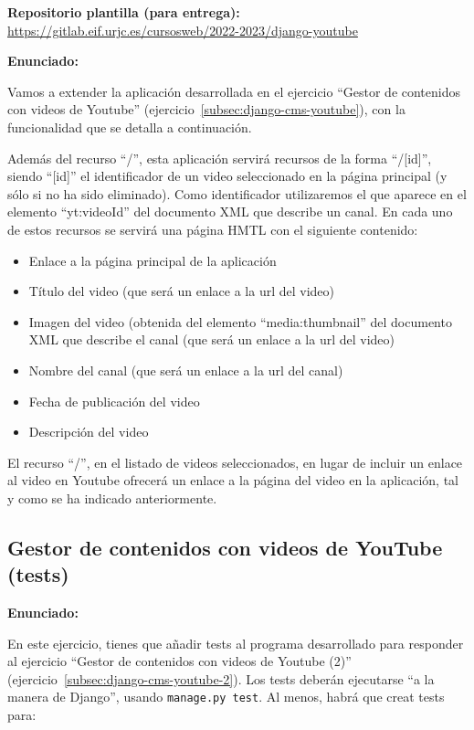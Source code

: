 \textbf{Repositorio plantilla (para entrega):} \\
\url{https://gitlab.eif.urjc.es/cursosweb/2022-2023/django-youtube}

\textbf{Enunciado:}

Vamos a extender la aplicación desarrollada en el ejercicio ``Gestor de contenidos con videos de Youtube'' (ejercicio~\ref{subsec:django-cms-youtube}), con la funcionalidad que se detalla a continuación.

Además del recurso ``/'', esta aplicación servirá recursos de la forma ``/[id]'', siendo ``[id]'' el identificador de un video seleccionado en la página principal (y sólo si no ha sido eliminado). Como identificador utilizaremos el que aparece en el elemento ``yt:videoId'' del documento XML que describe un canal. En cada uno de estos recursos se servirá una página HMTL con el siguiente contenido:

\begin{itemize}
\item Enlace a la página principal de la aplicación
\item Título del video (que será un enlace a la url del video)
\item Imagen del video (obtenida del elemento ``media:thumbnail'' del documento XML que describe el canal (que será un enlace a la url del video)
\item Nombre del canal (que será un enlace a la url del canal)
\item Fecha de publicación del video
\item Descripción del video
\end{itemize}

El recurso ``/'', en el listado de videos seleccionados, en lugar de incluir un enlace al video en Youtube ofrecerá un enlace a la página del video en la aplicación, tal y como se ha indicado anteriormente.

\subsection{Gestor de contenidos con videos de YouTube (tests)}
\label{subsec:django-cms-youtube-tests}

\textbf{Enunciado:}

En este ejercicio, tienes que añadir tests al programa desarrollado para responder al ejercicio  ``Gestor de contenidos con videos de Youtube (2)'' (ejercicio~\ref{subsec:django-cms-youtube-2}). Los tests deberán ejecutarse ``a la manera de Django'', usando \verb|manage.py test|. Al menos, habrá que creat tests para:

